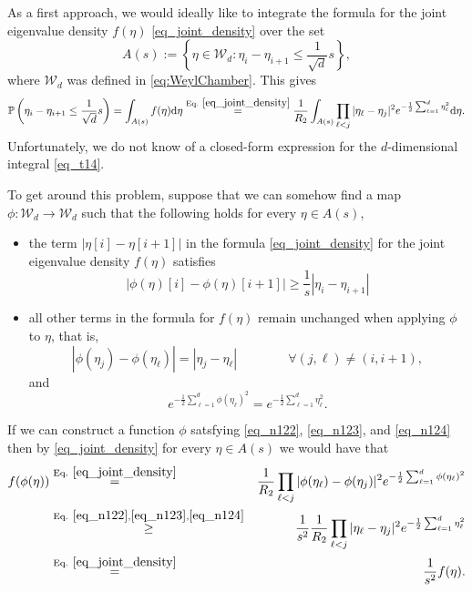 \documentclass[11pt,letterpaper]{article}
\begin{document}
As a first approach, we would ideally like to integrate the formula for the joint eigenvalue density $f(\eta)$  \eqref{eq_joint_density} over the set 
%
\begin{equation}\label{eq_n182}
A(s):= \left\{\eta \in \mathcal{W}_d: \eta_i - \eta_{i+1} \leq \frac{1}{\sqrt{d}} s \right\},
\end{equation}
%
 where $\mathcal{W}_d$ was defined in \eqref{eq:WeylChamber}.
 This gives
% 
\begin{eqnarray}\label{eq_t14}
   \mathbb{P}\left(\eta_i - \eta_{i+1} \leq \frac{1}{\sqrt{d}} s\right) =  \int_{A(s)}   f(\eta) \mathrm{d} \eta   \stackrel{\textrm{Eq. } \eqref{eq_joint_density}}{=} \frac{1}{R_2} \int_{A(s)}   \prod_{\ell<j} | \eta_{\ell} - \eta_j|^2 e^{-\frac{1}{2} \sum_{\ell=1}^d \eta_{\ell}^2} \mathrm{d} \eta.
\end{eqnarray}
%
Unfortunately, we do not know of a closed-form expression for the $d$-dimensional integral \eqref{eq_t14}.

To get around this problem, suppose that we can somehow find a map $\phi: \mathcal{W}_d \rightarrow \mathcal{W}_d$ such that the following holds for every $\eta \in A(s)$, 
\begin{itemize}
\item     the term $|\eta[i] - \eta[i+1]|$ in the formula \eqref{eq_joint_density} for the joint eigenvalue density $f(\eta)$ satisfies
\begin{equation}\label{eq_n122}
|\phi(\eta)[i] - \phi(\eta)[i+1]| \geq \frac{1}{s}|\eta_i - \eta_{i+1}|
\end{equation}
\item    all other terms in the formula for $f(\eta)$ remain unchanged when applying $\phi$ to $\eta$, that is,  
%
\begin{equation}\label{eq_n123}
|\phi(\eta_j) - \phi(\eta_\ell)| = |\eta_j - \eta_\ell| \qquad \qquad \forall  (j, \ell) \neq (i, i+1),
\end{equation}
%
and
%
\begin{equation}\label{eq_n124}
 e^{-\frac{1}{2} \sum_{\ell=1}^d \phi(\eta_{\ell})^2} = e^{-\frac{1}{2} \sum_{\ell=1}^d \eta_{\ell}^2}.
\end{equation}
\end{itemize}
%
If we can construct a function $\phi$ satsfying \eqref{eq_n122}, \eqref{eq_n123}, and \eqref{eq_n124} then by \eqref{eq_joint_density}   for every $\eta \in A(s)$ we would have that 
%
\begin{eqnarray}\label{eq_n126}
f(\phi(\eta)) &\stackrel{\textrm{Eq. } \eqref{eq_joint_density}}{=}&  \frac{1}{R_2}\prod_{\ell<j} | \phi(\eta_{\ell}) - \phi(\eta_j)|^2 e^{-\frac{1}{2} \sum_{\ell=1}^d \phi(\eta_{\ell})^2} \nonumber\\
%
&\stackrel{\textrm{Eq. } \eqref{eq_n122}, \eqref{eq_n123}, \eqref{eq_n124}}{\geq}&  \frac{1}{s^2}   \frac{1}{R_2} \prod_{\ell<j} | \eta_{\ell} - \eta_j|^2 e^{-\frac{1}{2} \sum_{\ell=1}^d \eta_{\ell}^2}  \nonumber\\
%
&\stackrel{\textrm{Eq. } \eqref{eq_joint_density}}{=}& \frac{1}{s^2}f(\eta).
\end{eqnarray}
\end{document}
